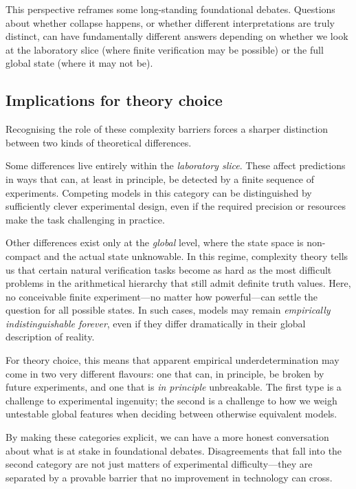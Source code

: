 \documentclass[12pt]{article}
\theoremstyle{definition}
\theoremstyle{plain}
\begin{document}
This perspective reframes some long-standing foundational debates. Questions
about whether collapse happens, or whether different interpretations are truly
distinct, can have fundamentally different answers depending on whether we
look at the laboratory slice (where finite verification may be possible) or the
full global state (where it may not be).

\subsection{Implications for theory choice}

Recognising the role of these complexity barriers forces a sharper distinction
between two kinds of theoretical differences.

Some differences live entirely within the \emph{laboratory slice}. These affect
predictions in ways that can, at least in principle, be detected by a finite
sequence of experiments. Competing models in this category can be distinguished
by sufficiently clever experimental design, even if the required precision or
resources make the task challenging in practice.

Other differences exist only at the \emph{global} level, where the state space
is non-compact and the actual state unknowable. In this regime, complexity
theory tells us that certain natural verification tasks become as hard as the
most difficult problems in the arithmetical hierarchy that still admit definite
truth values. Here, no conceivable finite experiment—no matter how powerful—can
settle the question for all possible states. In such cases, models may remain
\emph{empirically indistinguishable forever}, even if they differ dramatically
in their global description of reality.

For theory choice, this means that apparent empirical underdetermination may
come in two very different flavours: one that can, in principle, be broken by
future experiments, and one that is \emph{in principle} unbreakable. The first
type is a challenge to experimental ingenuity; the second is a challenge to how
we weigh untestable global features when deciding between otherwise equivalent
models.

By making these categories explicit, we can have a more honest conversation
about what is at stake in foundational debates. Disagreements that fall into
the second category are not just matters of experimental difficulty—they are
separated by a provable barrier that no improvement in technology can cross.
\end{document}
